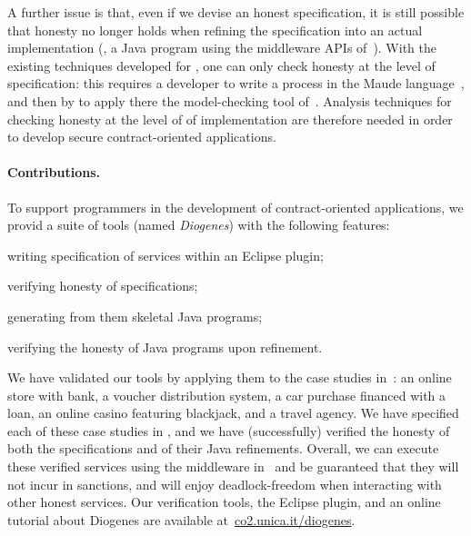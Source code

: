 A further issue is that, 
even if we devise an honest \coco specification, 
it is still possible that honesty no longer holds 
when refining the specification into an actual implementation 
(\eg, a Java program using the middleware APIs of~\cite{CO2middleware}). %
%
With the existing techniques developed for \coco, 
one can only check honesty at the level of specification:
this requires a developer to
write a \coco process in the Maude language~\cite{Maude01},
and then by to apply there the model-checking tool of~\cite{BMSZ15jlamp}. %
Analysis techniques for checking honesty at the level of of implementation
are therefore needed in order to develop secure contract-oriented applications.

\paragraph{Contributions.}

To support programmers in the development of contract-oriented 
applications, we provid a suite of tools (named \emph{Diogenes}) 
with the following features:
\begin{inlinelist}
\item writing \coco specification of services within an Eclipse plugin;
\item verifying honesty of \coco specifications;
\item generating from them skeletal Java programs;
\item verifying the honesty of Java programs upon refinement.
\end{inlinelist}
We have validated our tools by applying them to
the case studies in~\cite{BMSZ15jlamp}:
an online store with bank,
a voucher distribution system,
a car purchase financed with a loan,
an online casino featuring blackjack,
and a travel agency.
We have specified each of these case studies in \coco,
and we have (successfully) verified the honesty of 
both the specifications and of their Java refinements.
Overall, we can execute these verified services using the middleware in~\cite{CO2middleware}
and be guaranteed that they will not incur in sanctions,
and will enjoy deadlock-freedom when interacting with other honest services.
Our verification tools, the Eclipse plugin, and an online tutorial about Diogenes
are available at~\url{co2.unica.it/diogenes}.








